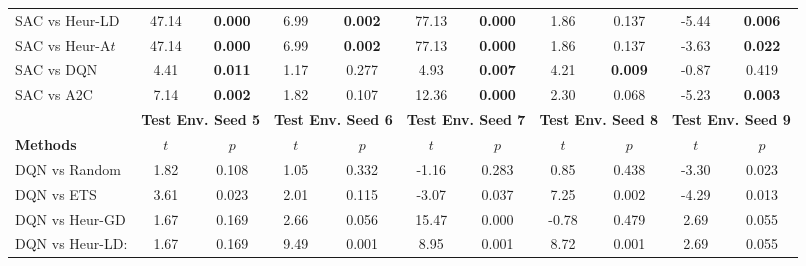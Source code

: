 \begin{tabular}{lcccccccccc}
	SAC vs Heur-LD   & 47.14         & \textbf{0.000}         & 6.99          & \textbf{0.002}         & 77.13          & \textbf{0.000}        & 1.86          & 0.137                  & -5.44          & \textbf{0.006}        \\
	SAC vs Heur-A$t$ & 47.14         & \textbf{0.000}         & 6.99          & \textbf{0.002}         & 77.13          & \textbf{0.000}        & 1.86          & 0.137                  & -3.63          & \textbf{0.022}        \\
	SAC vs DQN       & 4.41          & \textbf{0.011}         & 1.17          & 0.277                  & 4.93           & \textbf{0.007}        & 4.21          & \textbf{0.009}         & -0.87          & 0.419                 \\
	SAC vs A2C       & 7.14          & \textbf{0.002}         & 1.82          & 0.107                  & 12.36          & \textbf{0.000}        & 2.30          & 0.068                  & -5.23          & \textbf{0.003}        \\
	\midrule 
	& \multicolumn{2}{c}{\textbf{Test Env. Seed 5}} & \multicolumn{2}{c}{\textbf{Test Env. Seed 6}} & \multicolumn{2}{c}{\textbf{Test Env. Seed 7}} & \multicolumn{2}{c}{\textbf{Test Env. Seed 8}} & \multicolumn{2}{c}{\textbf{Test Env. Seed 9}} \\
	\cmidrule(lr){2-3} \cmidrule(lr){4-5} \cmidrule(lr){6-7} \cmidrule(lr){8-9} \cmidrule(lr){10-11}
	\textbf{Methods} & $t$             & $p$                         & $t$             & $p$                         & $t$              & $p$                        & $t$             & $p$                         & $t$              & $p$                        \\
	\midrule 
	DQN vs Random    & 1.82          & 0.108                  & 1.05          & 0.332                  & -1.16          & 0.283                 & 0.85          & 0.438                  & -3.30          & 0.023                 \\
	DQN vs ETS       & 3.61          & 0.023                  & 2.01          & 0.115                  & -3.07          & 0.037                 & 7.25          & 0.002                  & -4.29          & 0.013                 \\
	DQN vs Heur-GD   & 1.67          & 0.169                  & 2.66          & 0.056                  & 15.47          & 0.000                 & -0.78         & 0.479                  & 2.69           & 0.055                 \\
	DQN vs Heur-LD:  & 1.67          & 0.169                  & 9.49          & 0.001                  & 8.95           & 0.001                 & 8.72          & 0.001                  & 2.69           & 0.055                 \\

\end{tabular}
